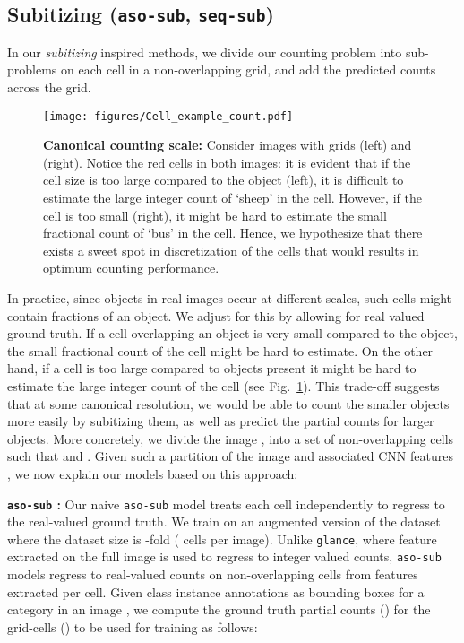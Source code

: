 \documentclass[10pt,twocolumn,letterpaper]{article}
\newcommand{\sub}{\texttt{aso-sub}\xspace}
\newcommand{\seq}{\texttt{seq-sub}\xspace}
\newcommand{\glance}{\texttt{glance}\xspace}
\begin{document}
\subsection{Subitizing (\sub{}, \seq{})}\label{app:aso-sub}
In our \emph{subitizing} inspired methods, we divide our counting problem into sub-problems on each cell in a non-overlapping grid, and add the predicted counts across the grid. 
\begin{figure}[t]
\texttt{[image: figures/Cell\_example\_count.pdf]}
\vspace{-15pt}
\caption{\footnotesize{\textbf{Canonical counting scale:} Consider images with grids  (left) and  (right). Notice the red cells in both images: it is evident that if the cell size is too large compared to the object (left), it is difficult to estimate the large integer count of `sheep' in the cell. However, if the cell is too small (right), it might be hard to estimate the small fractional count of `bus' in the cell. Hence, we hypothesize that there exists a sweet spot in discretization of the cells that would results in optimum counting performance.}}
\label{fig:cell_example}
\vspace{-20pt}
\end{figure}
In practice, since objects in real images occur at different scales, such cells might contain fractions of an object. We adjust for this by allowing for real valued ground truth. If a cell overlapping an object is very small compared to the object, the small fractional count of the cell might be hard to estimate. On the other hand, if a cell is too large compared to objects present it might be hard to estimate the large integer count of the cell (see Fig.~\ref{fig:cell_example}). This trade-off suggests that at some canonical resolution, we would be able to count the smaller objects more easily by subitizing them, as well as predict the partial counts for larger objects. 
More concretely, we divide the image , into a set of  non-overlapping cells  such that  and . Given such a partition  of the image  and associated CNN features , we now explain our models based on this approach:
\par \noindent
\textbf{\sub{} :} Our naive \sub{} model treats each cell independently to regress to the real-valued ground truth. We train on an augmented version of the dataset where the dataset size is -fold ( cells per image). Unlike \glance, where feature extracted on the full image is used to regress to integer valued counts, \sub models regress to real-valued counts on non-overlapping cells from features extracted per cell.
Given class instance annotations as bounding boxes   for a category  in an image , we compute the ground truth partial counts () for the grid-cells () to be used for training as follows: 
\end{document}
